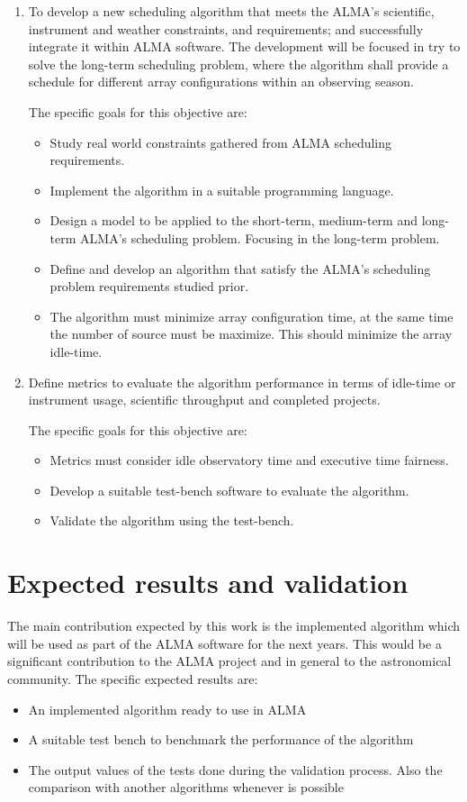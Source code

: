 \begin{enumerate}

\item To develop a new scheduling algorithm that meets the ALMA’s scientific, instrument and
weather constraints, and requirements; and successfully integrate it within ALMA software.
The development will be focused in try to solve the long-term scheduling problem, where
the algorithm shall provide a schedule for different array configurations within an
observing season.

The specific goals for this objective are:
\begin{itemize}
\item Study real world constraints gathered from ALMA scheduling requirements.
\item Implement the algorithm in a suitable programming language.
\item Design a model to be applied to the short-term, medium-term and long-term ALMA’s
scheduling problem. Focusing in the long-term problem.
\item Define and develop an algorithm that satisfy the ALMA’s scheduling problem requirements
studied prior.
\item The algorithm must minimize array configuration time, at the same time the number of source
must be maximize. This should minimize the array idle-time.
\end{itemize}
\item Define metrics to evaluate the algorithm performance in terms of idle-time or instrument
usage, scientific throughput and completed projects.

The specific goals for this objective are:
\begin{itemize}
\item Metrics must consider idle observatory time and executive time fairness.
\item Develop a suitable test-bench software to evaluate the algorithm.
\item Validate the algorithm using the test-bench.
\end{itemize}
\end{enumerate}

\section{Expected results and validation}
The main contribution expected by this work is the implemented algorithm which will be used as
part of the ALMA software for the next years. This would be a significant contribution to the
ALMA project and in general to the astronomical community.
The specific expected results are:
\begin{itemize}
\item An implemented algorithm ready to use in ALMA
\item A suitable test bench to benchmark the performance of the algorithm
\item The output values of the tests done during the validation process. Also the comparison with
another algorithms whenever is possible
\end{itemize}

